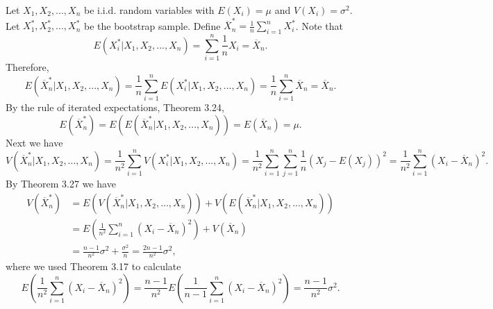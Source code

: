 Let $X_1, X_2, ..., X_n$ be i.i.d. random variables with $E(X_i) = \mu$ and $V(X_i) = \sigma^2$.
Let $X_1^*, X_2^*, ..., X_n^*$ be the bootstrap sample.
Define $\overline{X}_n^* = \frac{1}{n} \sum_{i=1}^n X_i^*$.
Note that
\begin{equation*}
    E(X^*_i | X_1, X_2, ..., X_n)
        = \sum_{i = 1}^n \frac{1}{n} X_i
        = \overline{X}_n.
\end{equation*}
Therefore,
\begin{equation*}
    E(\overline{X}_n^* | X_1, X_2, ..., X_n)
        = \frac{1}{n} \sum_{i = 1}^n E(X_i^* | X_1, X_2, ..., X_n)
        = \frac{1}{n} \sum_{i = 1}^n \overline{X}_n
        = \overline{X}_n.
\end{equation*}
By the rule of iterated expectations, Theorem 3.24,
\begin{equation*}
    E(\overline{X}_n^*)
        = E(E(\overline{X}_n^* | X_1, X_2, ..., X_n))
        = E(\overline{X}_n)
        = \mu.
\end{equation*}
Next we have
\begin{equation*}
    V(\overline{X}_n^*|X_1, X_2, ..., X_n)
        = \frac{1}{n^2} \sum_{i = 1}^n V(X_i^*|X_1, X_2, ..., X_n)
        = \frac{1}{n^2} \sum_{i = 1}^n \sum_{j = 1}^n \frac{1}{n} (X_j - E(X_j))^2
        = \frac{1}{n^2} \sum_{i = 1}^n (X_i - \overline{X}_n)^2.
\end{equation*}
By Theorem 3.27 we have
\begin{equation*}
    \begin{split}
        V(\overline{X}_n^*)
            &= E(V(\overline{X}_n^*|X_1, X_2, ..., X_n)) + V(E(\overline{X}_n^*|X_1, X_2, ..., X_n)) \\
            &= E\left(\frac{1}{n^2} \sum_{i = 1}^n (X_i - \overline{X}_n)^2\right) + V(\overline{X}_n) \\
            &= \frac{n - 1}{n^2} \sigma^2 + \frac{\sigma^2}{n}
            = \frac{2n - 1}{n^2} \sigma^2,
    \end{split}
\end{equation*}
where we used Theorem 3.17 to calculate
\begin{equation*}
    E\left(\frac{1}{n^2} \sum_{i = 1}^n (X_i - \overline{X}_n)^2\right)
        = \frac{n - 1}{n^2} E\left( \frac{1}{n - 1} \sum_{i = 1}^n (X_i - \overline{X}_n)^2 \right)
        = \frac{n - 1}{n^2} \sigma^2.
\end{equation*}
